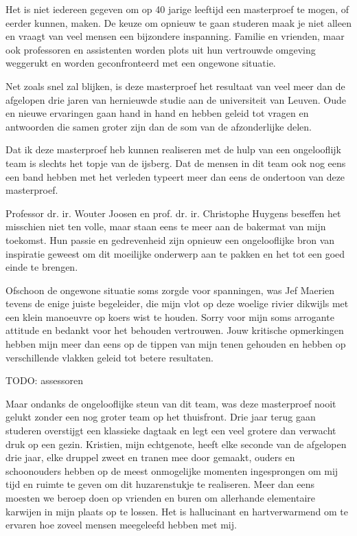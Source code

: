 
\begin{preface}

Het is niet iedereen gegeven om op 40 jarige leeftijd een masterproef te mogen,
of eerder kunnen, maken. De keuze om opnieuw te gaan studeren maak je niet
alleen en vraagt van veel mensen een bijzondere inspanning. Familie en
vrienden, maar ook professoren en assistenten worden plots uit hun vertrouwde
omgeving weggerukt en worden geconfronteerd met een ongewone situatie.

Net zoals snel zal blijken, is deze masterproef het resultaat van veel meer dan
de afgelopen drie jaren van hernieuwde studie aan de universiteit van Leuven.
Oude en nieuwe ervaringen gaan hand in hand en hebben geleid tot vragen en
antwoorden die samen groter zijn dan de som van de afzonderlijke delen.

Dat ik deze masterproef heb kunnen realiseren met de hulp van een ongelooflijk
team is slechts het topje van de ijsberg. Dat de mensen in dit team ook nog
eens een band hebben met het verleden typeert meer dan eens de ondertoon van
deze masterproef.

Professor dr. ir. Wouter Joosen en prof. dr. ir. Christophe Huygens beseffen
het misschien niet ten volle, maar staan eens te meer aan de bakermat van mijn
toekomst. Hun passie en gedrevenheid zijn opnieuw een ongelooflijke bron van
inspiratie geweest om dit moeilijke onderwerp aan te pakken en het tot een goed
einde te brengen.

Ofschoon de ongewone situatie soms zorgde voor spanningen, was Jef Maerien
tevens de enige juiste begeleider, die mijn vlot op deze woelige rivier
dikwijls met een klein manoeuvre op koers wist te houden. Sorry voor mijn soms
arrogante attitude en bedankt voor het behouden vertrouwen. Jouw kritische
opmerkingen hebben mijn meer dan eens op de tippen van mijn tenen gehouden en
hebben op verschillende vlakken geleid tot betere resultaten.

TODO: assessoren

Maar ondanks de ongelooflijke steun van dit team, was deze masterproef nooit
gelukt zonder een nog groter team op het thuisfront. Drie jaar terug gaan
studeren overstijgt een klassieke dagtaak en legt een veel grotere dan verwacht
druk op een gezin. Kristien, mijn echtgenote, heeft elke seconde van de
afgelopen drie jaar, elke druppel zweet en tranen mee door gemaakt, ouders en
schoonouders hebben op de meest onmogelijke momenten ingesprongen om mij tijd
en ruimte te geven om dit huzarenstukje te realiseren. Meer dan eens moesten we
beroep doen op vrienden en buren om allerhande elementaire karwijen in mijn
plaats op te lossen. Het is hallucinant en hartverwarmend om te ervaren hoe
zoveel mensen meegeleefd hebben met mij.


\end{preface}
